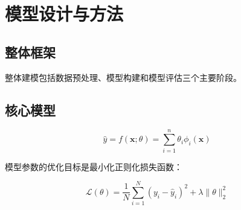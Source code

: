 \section{模型设计与方法}

\subsection{整体框架}

整体建模包括数据预处理、模型构建和模型评估三个主要阶段。

\subsection{核心模型}

\begin{equation}
\hat{y} = f(\mathbf{x}; \theta) = \sum_{i=1}^{n} \theta_i \phi_i(\mathbf{x})
  \label{eq:3-model-design-1}
\end{equation}

模型参数的优化目标是最小化正则化损失函数：

\begin{equation}
\mathcal{L}(\theta) = \frac{1}{N} \sum_{i=1}^{N} (y_i - \hat{y}_i)^2 + \lambda \|\theta\|_2^2
  \label{eq:3-model-design-2}
\end{equation}
